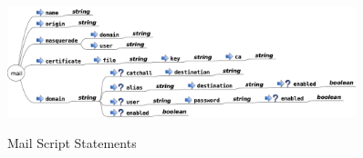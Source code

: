 \begin{figure}
\includegraphics[width=0.9\textwidth]{mail_service_script}
\label{fig:mail_script_statements}
\caption{Mail Script Statements}
\end{figure}
